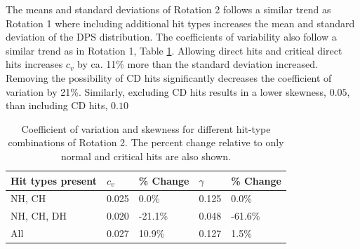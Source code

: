 \documentclass{article}
\begin{document}

        The means and standard deviations of Rotation 2 follows a similar trend as Rotation 1 where including additional hit types increases the mean and standard deviation of the DPS distribution. The coefficients of variability also follow a similar trend as in Rotation 1, Table \ref{t:r2-cv}. Allowing direct hits and critical direct hits increases $c_v$ by ca. 11\% more than the standard deviation increased. Removing the possibility of CD hits significantly decreases the coefficient of variation by 21\%. Similarly, excluding CD hits results in a lower skewness, $0.05$, than including CD hits, $0.10$

        \begin{table}[H]
            \centering
            \caption{Coefficient of variation and skewness for different hit-type combinations of Rotation 2. The percent change relative to only normal and critical hits are also shown.}\label{t:r2-cv}
            \begin{tabular}{@{}lllll@{}}
            \toprule
            Hit types present & $c_v$ & \% Change & $\gamma$ & \% Change \\ \midrule
            NH, CH            & 0.025 & 0.0\%     & 0.125    & 0.0\%     \\
            NH, CH, DH        & 0.020 & -21.1\%   & 0.048    & -61.6\%   \\
            All               & 0.027 & 10.9\%    & 0.127    & 1.5\%     \\ \bottomrule
            \end{tabular}
        \end{table}
\end{document}
